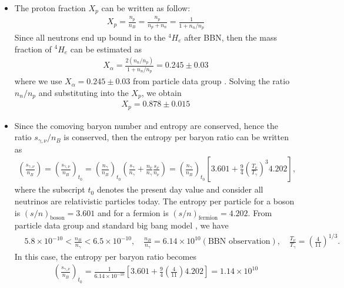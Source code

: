 \documentclass[Universe,article,submit,moreauthors,pdftex]{Definitions/mdpi}
\begin{document}
\begin{itemize}

  \item The proton fraction $X_p$ can be written as follow:
  \begin{align}
  X_p=\frac{n_p}{n_B}=\frac{n_p}{n_p+n_n}=\frac{1}{1+n_n/n_p}
  \end{align}
Since all neutrons end up bound in to the $^4H_e$ after BBN, then the mass fraction of $^4H_e$ can be estimated as 
\begin{align}
X_\alpha=\frac{2(n_n/n_p)}{1+n_n/n_p}=0.245\pm0.03
\end{align} 
where we use $X_\alpha=0.245\pm0.03$ from particle data group \cite{ParticleDataGroup:2022pth}. Solving the ratio $n_n/n_p$ and substituting into the $X_p$, we obtain
\begin{align}
X_p=0.878\pm0.015
\end{align}

  \item Since the comoving baryon number and entropy are conserved, hence the ratio $s_{\gamma,\nu}/n_B$ is conserved, then the entropy per baryon ratio can be written as
\begin{align}
\left(\frac{s_{\gamma,\nu}}{n_B}\right)=\left(\frac{s_{\gamma,\nu}}{n_B}\right)_{\!\!t_0}\!\!=\left(\frac{n_\gamma}{n_B}\right)_{\!\!t_0}\left(\frac{s_\gamma}{n_\gamma}+\frac{n_\nu}{n_\gamma}\frac{s_\nu}{n_\nu}\right)=\left(\frac{n_\gamma}{n_B}\right)_{\!\!t_0}\left[3.601+\frac{9}{4}\left(\frac{T_\nu}{T_\gamma}\right)^{\!\!3}4.202\right],
\end{align}
where the subscript $t_0$ denotes the present day value and consider all neutrinos are relativistic particles today. The entropy per particle for a boson is $(s/n)_\mathrm{boson}=3.601$ and for a fermion is $(s/n)_\mathrm{fermion}=4.202$. From particle data group and standard big bang model \cite{ParticleDataGroup:2022pth,Kolb:1990vq}, we have
\begin{align}
&5.8\times10^{-10}<\frac{n_B}{n_\gamma}<6.5\times10^{-10},\quad\frac{n_B}{n_\gamma}=6.14\times10^{10}(\mathrm{BBN\,\,observation}),\quad\frac{T_\nu}{T_\gamma}=\left(\frac{4}{11}\right)^{1/3}.
\end{align}
In this case, the entropy per baryon ratio  becomes
\begin{align}
\left(\frac{s_{\gamma,\nu}}{n_B}\right)_{\!\!t_0}=\frac{1}{6.14\times10^{-10}}\left[3.601+\frac{9}{4}\left(\frac{4}{11}\right)4.202\right]=1.14\times10^{10}
\end{align}


\end{itemize}
\end{document}
